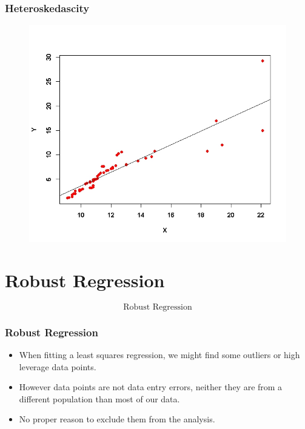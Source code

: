 \documentclass{beamer}
\begin{document}
\begin{frame}
	\frametitle{Heteroskedascity}
	\large
	\begin{figure}
		\centering
		\includegraphics[width=0.95\linewidth]{images/ExamQ2plot}
	\end{figure}
	
\end{frame}
\section{Robust Regression}
\begin{frame}
	\LARGE
	\[\mbox{Robust Regression}\]
\end{frame}
\begin{frame}
	\frametitle{Robust Regression}
	\large
\begin{itemize}
	\item When fitting a least squares regression, we might find some outliers or high leverage data points.
	\item However data points are not data entry errors, neither they are from a different 
	population than most of our data. 
	\item No proper reason to exclude them from the analysis. 
\end{itemize}
\end{frame}

\end{document}
